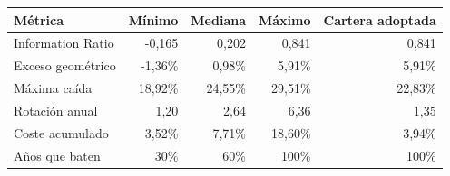 \begin{tabular}{lrrrr}
\toprule
Métrica & Mínimo & Mediana & Máximo & Cartera adoptada \\
\midrule
Information Ratio & -0,165 & 0,202 & 0,841 & 0,841 \\
Exceso geométrico & -1,36\% & 0,98\% & 5,91\% & 5,91\% \\
Máxima caída & 18,92\% & 24,55\% & 29,51\% & 22,83\% \\
Rotación anual & 1,20 & 2,64 & 6,36 & 1,35 \\
Coste acumulado & 3,52\% & 7,71\% & 18,60\% & 3,94\% \\
Años que baten & 30\% & 60\% & 100\% & 100\% \\
\bottomrule
\end{tabular}
